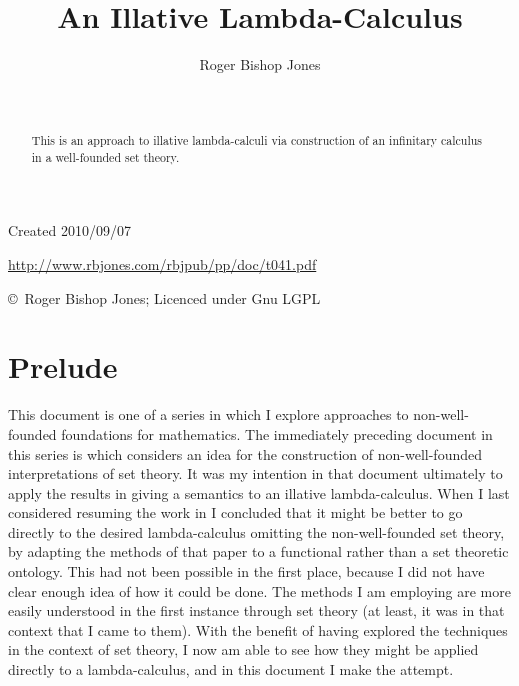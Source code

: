 \documentclass[11pt]{article}
\title{An Illative Lambda-Calculus}
\author{Roger Bishop Jones}
\date{\ }
\begin{document}
\begin{titlepage}
\maketitle
\begin{abstract}
This is an approach to illative lambda-calculi via construction of an infinitary calculus in a well-founded set theory.
\end{abstract}
\vfill

\begin{centering}
{\footnotesize

Created 2010/09/07



\href{http://www.rbjones.com/rbjpub/pp/doc/t041.pdf}
{http://www.rbjones.com/rbjpub/pp/doc/t041.pdf}

\copyright\ Roger Bishop Jones; Licenced under Gnu LGPL

}%
\end{centering}

\thispagestyle{empty}
\end{titlepage}

\newpage
\addtocounter{page}{1}
{\parskip=0pt\tableofcontents}

\section{Prelude}

This document is one of a series in which I explore approaches to non-well-founded foundations for mathematics.
The immediately preceding document in this series is \cite{rbjt027} which considers an idea for the construction of non-well-founded interpretations of set theory.
It was my intention in that document ultimately to apply the results in giving a semantics to an illative lambda-calculus.
When I last considered resuming the work in \cite{rbjt027} I concluded that it might be better to go directly to the desired lambda-calculus omitting the non-well-founded set theory, by adapting the methods of that paper to a functional rather than a set theoretic ontology.
This had not been possible in the first place, because I did not have clear enough idea of how it could be done.
The methods I am employing are more easily understood in the first instance through set theory (at least, it was in that context that I came to them).
With the benefit of having explored the techniques in the context of set theory, I now am able to see how they might be applied directly to a lambda-calculus, and in this document I make the attempt.
\end{document}
